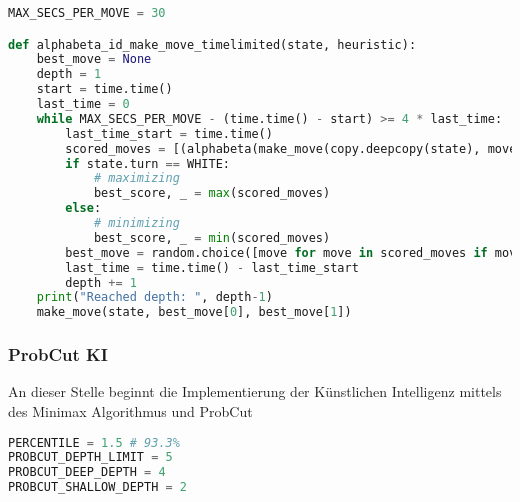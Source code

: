 \begin{lstlisting}[language=Python]
MAX_SECS_PER_MOVE = 30

def alphabeta_id_make_move_timelimited(state, heuristic):
    best_move = None
    depth = 1
    start = time.time()
    last_time = 0
    while MAX_SECS_PER_MOVE - (time.time() - start) >= 4 * last_time:
        last_time_start = time.time()
        scored_moves = [(alphabeta(make_move(copy.deepcopy(state), move[0], move[1]), depth-1, -math.inf, math.inf, heuristic), move) for move in state.possible_moves]
        if state.turn == WHITE:
            # maximizing
            best_score, _ = max(scored_moves)
        else:
            # minimizing
            best_score, _ = min(scored_moves)
        best_move = random.choice([move for move in scored_moves if move[0] == best_score])[1]
        last_time = time.time() - last_time_start
        depth += 1
    print("Reached depth: ", depth-1)
    make_move(state, best_move[0], best_move[1])
\end{lstlisting}

\hypertarget{probcut-ki}{%
\subsubsection{ProbCut KI}\label{probcut-ki}}

An dieser Stelle beginnt die Implementierung der Künstlichen Intelligenz
mittels des Minimax Algorithmus und ProbCut

\begin{lstlisting}[language=Python]
PERCENTILE = 1.5 # 93.3%
PROBCUT_DEPTH_LIMIT = 5
PROBCUT_DEEP_DEPTH = 4
PROBCUT_SHALLOW_DEPTH = 2
\end{lstlisting}

